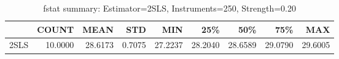 \begin{table}[ht]
\centering
\caption{fstat summary: Estimator=2SLS, Instruments=250, Strength=0.20}
\begin{tabular}{lrrrrrrrr}
\toprule
 & COUNT & MEAN & STD & MIN & 25\% & 50\% & 75\% & MAX \\
\midrule
2SLS & 10.0000 & 28.6173 & 0.7075 & 27.2237 & 28.2040 & 28.6589 & 29.0790 & 29.6005 \\
\bottomrule
\end{tabular}
\end{table}
